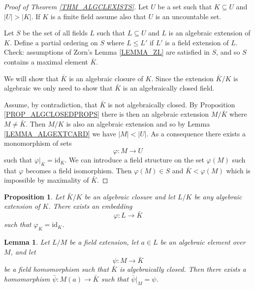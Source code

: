\documentclass[12pt, letterpaper, oneside]{article}
\theoremstyle{plain}
\newtheorem{lemma}[theorem]{Lemma}
\newtheorem{proposition}[theorem]{Proposition}
\theoremstyle{definition}
\newcommand{\id}{\mathrm{id}}
\newcommand{\vs}{\vskip 5mm}
\begin{document}
\begin{proof}[Proof of Theorem \ref{THM_ALGCLEXISTS}]
Let $U$ be a set such that  $K\subseteq U$ and $|U| > |K|$. If $K$ is a finite field 
assume also that $U$ is an uncountable set.

Let $S$ be the set of all fields $L$ such that $L\subseteq U$ and $L$ is an 
algebraic extension of $K$. Define a partial ordering on $S$ where $L \leq L'$
if $L'$ is a field extension of $L$.  Check: assumptions of Zorn's Lemma \ref{LEMMA_ZL} 
are satisfied in $S$, and so $S$ contains  a maximal element $\bar{K}$. 


We will show that $\bar{K}$ is an algebraic closure of $K$. Since the extension $\bar{K}/K$ 
is algebraic we only need to show that $\bar{K}$ is an algebraically closed field. 

Assume, by contradiction, that $\bar{K}$ is not algebraically closed. 
By Proposition \ref{PROP_ALGCLOSEDPROPS} there is then 
an algebraic extension $M/\bar{K}$ where $M\neq \bar{K}$. 
Then $M/K$ is also an algebraic extension and so by Lemma \ref{LEMMA_ALGEXTCARD}
we have $|M| < |U|$. 
As a consequence there exists a monomorphism of sets 
$$\varphi\colon M \to U$$
such that $\varphi|_{\bar{K}} = \id_{\bar{K}}$. We can introduce a field structure on the set $\varphi(M)$
such that $\varphi$ becomes a field isomorphism. Then $\varphi(M)\in S$  and 
$\bar{K} < \varphi(M)$ which is impossible by maximality of $\bar{K}$. 


\end{proof}


\vs\vs



\begin{proposition}
\label{PROP_EMBALGINALGCLOSURE}
Let $\bar{K}/K$ be an algebraic closure and let $L/K$ be any algebraic extension of $K$. 
There exists an embedding 
$$\varphi\colon L \to \bar{K}$$
such that $\varphi_{K} = \id_{K}$.
\end{proposition}


\vs\vs

\begin{lemma}
\label{LEMMA_EXTFIELDHOMOM}
Let $L/M$ be a field extension, let $a\in L$ be an algebraic element over $M$, and let
$$\psi\colon M \to \bar{K}$$ 
be a field homomorphism such that $\bar{K}$ is algebraically closed. Then there exists a 
homomorphism $\bar\psi\colon M(a) \to \bar{K}$ such that $\bar\psi|_{M} = \psi$. 
\end{lemma}
\end{document}
